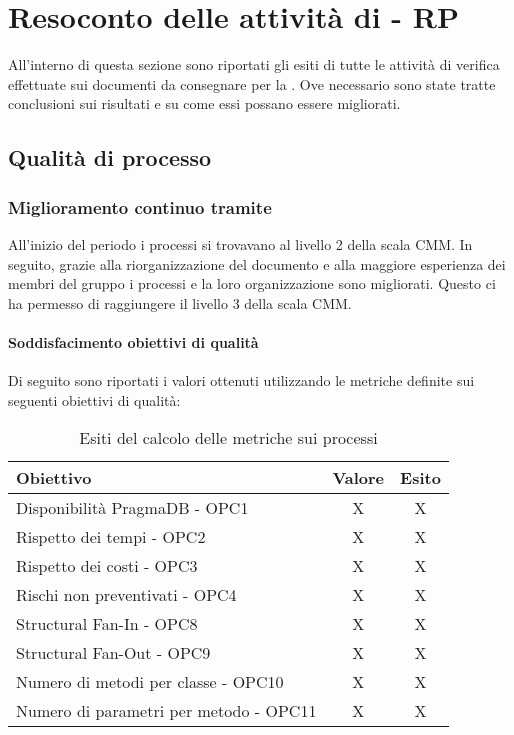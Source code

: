 \documentclass[PdQ.tex]{subfiles}
\begin{document}
\section{Resoconto delle attività di  - RP}
All'interno di questa sezione sono riportati gli esiti di tutte le attività di verifica effettuate sui documenti da consegnare per la \RP{}. Ove necessario sono state tratte conclusioni sui risultati e su come essi possano essere migliorati.

\subsection{Qualità di processo}
		\subsubsection{Miglioramento continuo tramite }
	
		All'inizio del periodo i processi si trovavano al livello 2 della scala CMM. In seguito, grazie alla riorganizzazione del documento \NPdocRP{} e alla maggiore esperienza dei membri del gruppo i processi e la loro organizzazione sono migliorati. Questo ci ha permesso di raggiungere il livello 3 della scala CMM. 

		\paragraph{Soddisfacimento obiettivi di qualità}
			Di seguito sono riportati i valori ottenuti utilizzando le metriche definite sui seguenti obiettivi di qualità:
			\begin{table}[h]
				\centering
				\begin{tabular}{l c c}
					\hline
					\rule[-0.3cm]{0cm}{0.8cm}
					\textbf{Obiettivo} & \textbf{Valore} & \textbf{Esito} \\
					\hline
					\rule[0cm]{0cm}{0.4cm}
					Disponibilità PragmaDB - OPC1 & X & X \\
					\rule[0cm]{0cm}{0.4cm}
					Rispetto dei tempi - OPC2 & X & X \\
					\rule[0cm]{0cm}{0.4cm}
					Rispetto dei costi - OPC3 & X & X\\ 
					\rule[0cm]{0cm}{0.4cm}
					Rischi non preventivati - OPC4 & X & X\\ 
					\rule[0cm]{0cm}{0.4cm}
					Structural Fan-In - OPC8 & X & X\\ 
					\rule[0cm]{0cm}{0.4cm}
					Structural Fan-Out - OPC9 & X & X\\ 
					\rule[0cm]{0cm}{0.4cm}
					Numero di metodi per classe - OPC10 & X & X\\ 
					\rule[0cm]{0cm}{0.4cm}
					Numero di parametri per metodo - OPC11 & X & X\\ 
					\hline
				\end{tabular}
				\caption{Esiti del calcolo delle metriche sui processi}
			\end{table}
		
\end{document}
